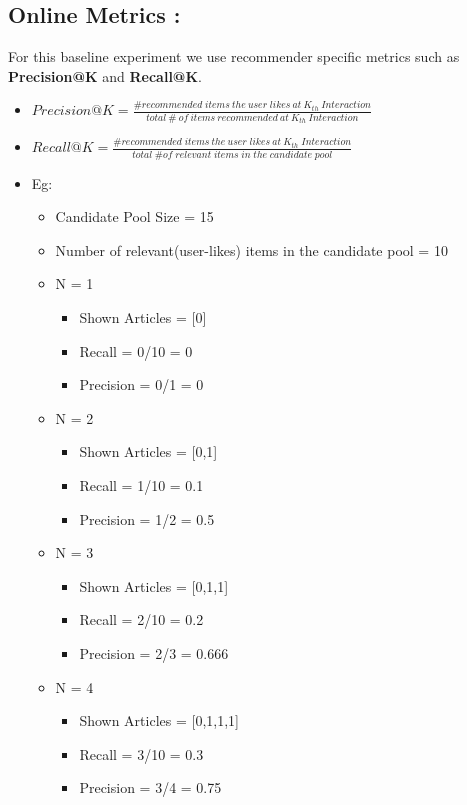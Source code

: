 \documentclass[a4paper,fontsize=9.0pt]{scrartcl}
\begin{document}
\subsection{Online Metrics :}
\begin{flushleft}
For this baseline experiment we use recommender specific metrics such as \textbf{Precision@K} and \textbf{Recall@K}.
\begin{itemize}
    \item $Precision@K = \frac{\# recommended \; items \: the \: user \; likes \: at \: K_{th} \: Interaction}{total \: \#  \: of \: items \:  recommended \: at \: K_{th} \: Interaction}$
    
    \item $Recall@K = \frac{\# recommended \; items \: the \: user \; likes \: at \: K_{th} \; Interaction}{total \; \# of \; relevant \; items \; in \; the \; candidate \; pool}$
    
    \item Eg:  \begin{itemize}
        \item Candidate Pool Size = 15
        \item Number of relevant(user-likes) items in the candidate pool = 10
        \item N = 1 \begin{itemize}
            \item Shown Articles = [0]
            \item Recall = 0/10 = 0
            \item Precision = 0/1 = 0
        \end{itemize}
        \item N = 2 \begin{itemize}
            \item Shown Articles = [0,1]
            \item Recall = 1/10 = 0.1
            \item Precision = 1/2 = 0.5
        \end{itemize}
        \item N = 3 \begin{itemize}
            \item Shown Articles = [0,1,1]
            \item Recall = 2/10 = 0.2
            \item Precision = 2/3 = 0.666
        \end{itemize}
        \item N = 4 \begin{itemize}
            \item Shown Articles = [0,1,1,1]
            \item Recall = 3/10 = 0.3
            \item Precision = 3/4 = 0.75
        \end{itemize}
    \end{itemize}
    
\end{itemize}
\end{flushleft}
\end{document}
